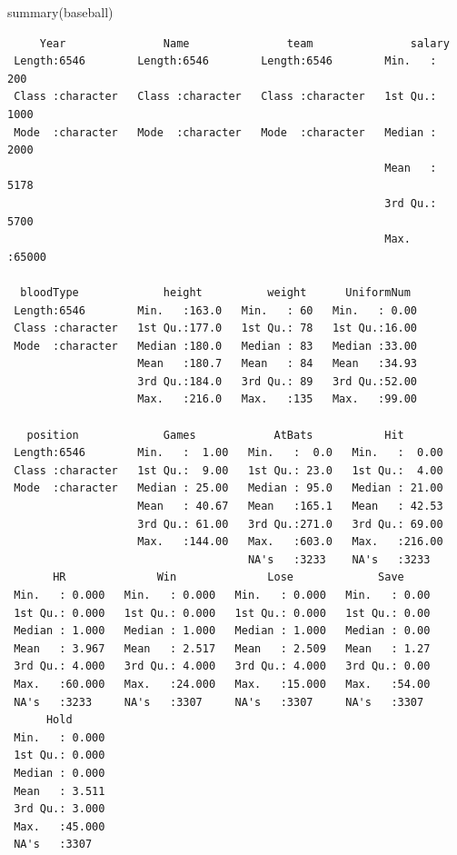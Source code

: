 \documentclass[
  a4paper,
]{ltjsbook}
\newenvironment{Shaded}{\begin{snugshade}}{\end{snugshade}}
\newcommand{\FunctionTok}[1]{\textcolor[rgb]{0.28,0.35,0.67}{#1}}
\newcommand{\NormalTok}[1]{\textcolor[rgb]{0.00,0.23,0.31}{#1}}
\begin{document}
\begin{Shaded}
\begin{Highlighting}[]
\FunctionTok{summary}\NormalTok{(baseball)}
\end{Highlighting}
\end{Shaded}

\begin{verbatim}
     Year               Name               team               salary     
 Length:6546        Length:6546        Length:6546        Min.   :  200  
 Class :character   Class :character   Class :character   1st Qu.: 1000  
 Mode  :character   Mode  :character   Mode  :character   Median : 2000  
                                                          Mean   : 5178  
                                                          3rd Qu.: 5700  
                                                          Max.   :65000  
                                                                         
  bloodType             height          weight      UniformNum   
 Length:6546        Min.   :163.0   Min.   : 60   Min.   : 0.00  
 Class :character   1st Qu.:177.0   1st Qu.: 78   1st Qu.:16.00  
 Mode  :character   Median :180.0   Median : 83   Median :33.00  
                    Mean   :180.7   Mean   : 84   Mean   :34.93  
                    3rd Qu.:184.0   3rd Qu.: 89   3rd Qu.:52.00  
                    Max.   :216.0   Max.   :135   Max.   :99.00  
                                                                 
   position             Games            AtBats           Hit        
 Length:6546        Min.   :  1.00   Min.   :  0.0   Min.   :  0.00  
 Class :character   1st Qu.:  9.00   1st Qu.: 23.0   1st Qu.:  4.00  
 Mode  :character   Median : 25.00   Median : 95.0   Median : 21.00  
                    Mean   : 40.67   Mean   :165.1   Mean   : 42.53  
                    3rd Qu.: 61.00   3rd Qu.:271.0   3rd Qu.: 69.00  
                    Max.   :144.00   Max.   :603.0   Max.   :216.00  
                                     NA's   :3233    NA's   :3233    
       HR              Win              Lose             Save      
 Min.   : 0.000   Min.   : 0.000   Min.   : 0.000   Min.   : 0.00  
 1st Qu.: 0.000   1st Qu.: 0.000   1st Qu.: 0.000   1st Qu.: 0.00  
 Median : 1.000   Median : 1.000   Median : 1.000   Median : 0.00  
 Mean   : 3.967   Mean   : 2.517   Mean   : 2.509   Mean   : 1.27  
 3rd Qu.: 4.000   3rd Qu.: 4.000   3rd Qu.: 4.000   3rd Qu.: 0.00  
 Max.   :60.000   Max.   :24.000   Max.   :15.000   Max.   :54.00  
 NA's   :3233     NA's   :3307     NA's   :3307     NA's   :3307   
      Hold       
 Min.   : 0.000  
 1st Qu.: 0.000  
 Median : 0.000  
 Mean   : 3.511  
 3rd Qu.: 3.000  
 Max.   :45.000  
 NA's   :3307    
\end{verbatim}
\end{document}
